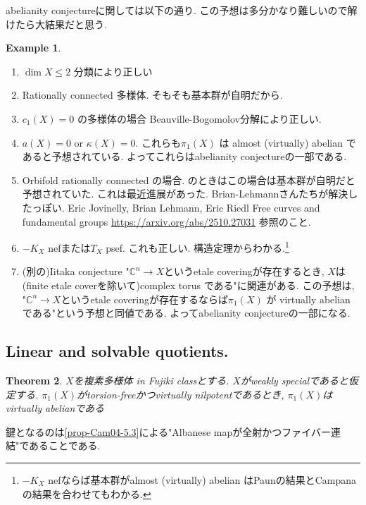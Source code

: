 \documentclass[dvipdfmx,a4paper,11pt]{article} %
\newtheorem{thm}{Theorem}[section]
\theoremstyle{definition}
\newtheorem{ex}[thm]{Example}
\theoremstyle{remark}
\numberwithin{equation}{section}
\newcommand{\C}{\mathbb{C}}
\begin{document}
abelianity conjectureに関しては以下の通り. この予想は多分かなり難しいので解けたら大結果だと思う. 
\begin{ex}\cite[Example 7.2]{Cam04}
\begin{enumerate}
\item $ \dim X \le 2$ 分類により正しい
\item Rationally connected 多様体. そもそも基本群が自明だから. 
\item \(c_1(X)=0\) の多様体の場合 Beauville-Bogomolov分解により正しい. 
\item  \(a(X)=0\) or \(\kappa(X)=0\). これらも\(\pi_1(X)\) は almost (virtually) abelian であると予想されている. よってこれらはabelianity conjectureの一部である.
\item Orbifold rationally connected の場合. \cite{Cam04}のときはこの場合は基本群が自明だと予想されていた. 
これは最近進展があった. Brian-Lehmannさんたちが解決したっぽい. Eric Jovinelly, Brian Lehmann, Eric Riedl Free curves and fundamental groups \url{https://arxiv.org/abs/2510.27031} 参照のこと. 
\item  \(-K_X\) nefまたは$T_X$ psef. これも正しい. 構造定理からわかる.\footnote{\(-K_X\) nefならば基本群がalmost (virtually) abelian はPaunの結果とCampanaの結果を合わせてもわかる. } 
\item (別の)Iitaka conjecture "$\C^n \to X$というetale coveringが存在するとき, $X$は(finite etale coverを除いて)complex torus である"に関連がある. この予想は,  "$\C^n \to X$というetale coveringが存在するならば\(\pi_1(X)\) が virtually abelian である"という予想と同値である. よってabelianity conjectureの一部になる. 
\end{enumerate}
\end{ex}
\subsection{Linear and solvable quotients. \cite[7.2]{Cam04}}

\begin{thm}
\label{thm-almostAbel}
$X$を複素多様体 in Fujiki classとする. 
$X$がweakly specialであると仮定する. 
$\pi_1(X)$がtorsion-freeかつvirtually nilpotentであるとき, $\pi_1(X)$はvirtually abelianである
\end{thm}
鍵となるのは\ref{prop-Cam04-5.3}による"Albanese mapが全射かつファイバー連結"であることである. 
\end{document}

